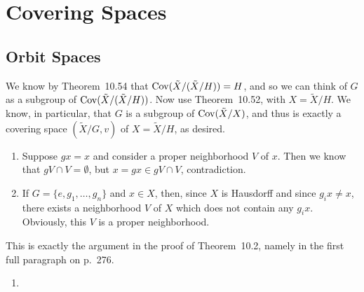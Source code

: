 \documentclass[../../solutions.tex]{subfiles}
\begin{document}
\section{Covering Spaces}
\subsection{Orbit Spaces}
\begin{exercise} \leavevmode
We know by Theorem~10.54 that $\operatorname{Cov}(\tilde X/(\tilde X/H))=H$, and so we can think of $G$ as a subgroup of $\operatorname{Cov}(\tilde X/(\tilde X/H))$.
Now use Theorem~10.52, with $X=\tilde X/H$.
We know, in particular, that $G$ is a subgroup of $\operatorname{Cov}(\tilde X/X)$, and thus is exactly a covering space $(\tilde X/G,v)$ of $X=\tilde X/H$, as desired.
\end{exercise}

\begin{exercise} \leavevmode
\begin{enumerate}
\item
Suppose $gx=x$ and consider a proper neighborhood $V$ of $x$.
Then we know that $gV\cap V=\emptyset$, but $x=gx\in gV\cap V$, contradiction.

\item
If $G=\{e,g_1,\dots,g_n\}$ and $x\in X$, then, since $X$ is Hausdorff and since $g_ix\ne x$, there exists a neighborhood $V$ of $X$ which does not contain any $g_ix$.
Obviously, this $V$ is a proper neighborhood.
\end{enumerate}
\end{exercise}

\begin{exercise} \leavevmode
This is exactly the argument in the proof of Theorem~10.2, namely in the first full paragraph on p.~276.
\end{exercise}

\begin{exercise} \leavevmode
\begin{enumerate}
\item

\end{enumerate}
\end{exercise}
\end{document}

